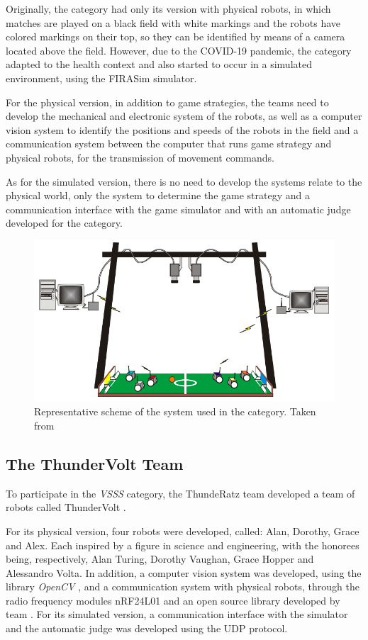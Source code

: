 Originally, the category had only its version with physical robots, in which matches are played on a black field with white markings and the robots have colored markings on their top, so they can be identified by means of a camera located above the field. However, due to the COVID-19 pandemic, the category adapted to the health context and also started to occur in a simulated environment, using the FIRASim \cite{FIRASim} simulator.

For the physical version, in addition to game strategies, the teams need to develop the mechanical and electronic system of the robots, as well as a computer vision system to identify the positions and speeds of the robots in the field and a communication system between the computer that runs game strategy and physical robots, for the transmission of movement commands.

As for the simulated version, there is no need to develop the systems relate to the physical world, only the system to determine the game strategy and a communication interface with the game simulator and with an automatic judge \cite{VSSReferee} developed for the category.

\begin{figure}[!h]
    \centering
    \includegraphics[width=.7\linewidth]{images/General System.png}
    \caption{Representative scheme of the system used in the category. Taken from \cite{FutRobosFerramentaDeEnsino}}
    \label{fig:general_system}
\end{figure}

\subsection{The ThunderVolt Team}

To participate in the \textit{VSSS} category, the ThundeRatz team developed a team of robots called ThunderVolt \cite{ThunderVolt} \cite{TDPThunderVolt}.

For its physical version, four robots were developed, called: Alan, Dorothy, Grace and Alex. Each inspired by a figure in science and engineering, with the honorees being, respectively, Alan Turing, Dorothy Vaughan, Grace Hopper and Alessandro Volta. In addition, a computer vision system was developed, using the library \textit{OpenCV} \cite{OpenCV}, and a communication system with physical robots, through the radio frequency modules nRF24L01 and an open source library developed by team \cite{STM3232RF24}. For its simulated version, a communication interface with the simulator and the automatic judge was developed using the UDP protocol.

